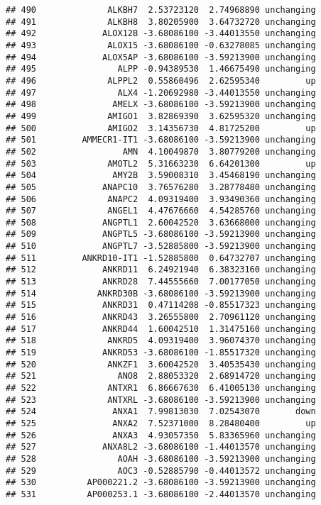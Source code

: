 \documentclass[]{article}
\begin{document}
\begin{verbatim}
## 490              ALKBH7  2.53723120  2.74968890 unchanging
## 491              ALKBH8  3.80205900  3.64732720 unchanging
## 492             ALOX12B -3.68086100 -3.44013550 unchanging
## 493              ALOX15 -3.68086100 -0.63278085 unchanging
## 494             ALOX5AP -3.68086100 -3.59213900 unchanging
## 495                ALPP -0.94389530  1.46675490 unchanging
## 496              ALPPL2  0.55860496  2.62595340         up
## 497                ALX4 -1.20692980 -3.44013550 unchanging
## 498               AMELX -3.68086100 -3.59213900 unchanging
## 499              AMIGO1  3.82869390  3.62595320 unchanging
## 500              AMIGO2  3.14356730  4.81725200         up
## 501         AMMECR1-IT1 -3.68086100 -3.59213900 unchanging
## 502                 AMN  4.10049870  3.80779200 unchanging
## 503              AMOTL2  5.31663230  6.64201300         up
## 504               AMY2B  3.59008310  3.45468190 unchanging
## 505             ANAPC10  3.76576280  3.28778480 unchanging
## 506              ANAPC2  4.09319400  3.93490360 unchanging
## 507              ANGEL1  4.47676660  4.54285760 unchanging
## 508             ANGPTL1  2.60042520  3.63668000 unchanging
## 509             ANGPTL5 -3.68086100 -3.59213900 unchanging
## 510             ANGPTL7 -3.52885800 -3.59213900 unchanging
## 511         ANKRD10-IT1 -1.52885800  0.64732707 unchanging
## 512             ANKRD11  6.24921940  6.38323160 unchanging
## 513             ANKRD28  7.44555660  7.00177050 unchanging
## 514            ANKRD30B -3.68086100 -3.59213900 unchanging
## 515             ANKRD31  0.47114208 -0.85517323 unchanging
## 516             ANKRD43  3.26555800  2.70961120 unchanging
## 517             ANKRD44  1.60042510  1.31475160 unchanging
## 518              ANKRD5  4.09319400  3.96074370 unchanging
## 519             ANKRD53 -3.68086100 -1.85517320 unchanging
## 520              ANKZF1  3.60042520  3.40535430 unchanging
## 521                ANO8  2.88053320  2.68914720 unchanging
## 522              ANTXR1  6.86667630  6.41005130 unchanging
## 523              ANTXRL -3.68086100 -3.59213900 unchanging
## 524               ANXA1  7.99813030  7.02543070       down
## 525               ANXA2  7.52371000  8.28480400         up
## 526               ANXA3  4.93057350  5.83365960 unchanging
## 527             ANXA8L2 -3.68086100 -1.44013570 unchanging
## 528                AOAH -3.68086100 -3.59213900 unchanging
## 529                AOC3 -0.52885790 -0.44013572 unchanging
## 530          AP000221.2 -3.68086100 -3.59213900 unchanging
## 531          AP000253.1 -3.68086100 -2.44013570 unchanging

\end{verbatim}
\end{document}
